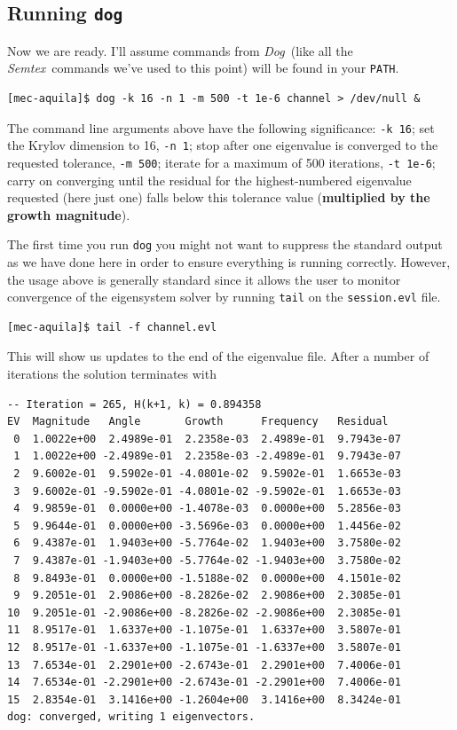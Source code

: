 \documentclass[11pt,a4paper]{report}
\newcommand{\Semtex}{\emph{Semtex}}
\newcommand{\Dog}{\emph{Dog}}
\begin{document}
\subsection{Running \texttt{dog}}

Now we are ready. I'll assume commands from \Dog\ (like all the
\Semtex\ commands we've used to this point) will be found in your
\texttt{PATH}.
{\small
\begin{verbatim}
[mec-aquila]$ dog -k 16 -n 1 -m 500 -t 1e-6 channel > /dev/null &
\end{verbatim}
}The command line arguments above have the following significance:
\verb+-k 16+; set the Krylov dimension to 16, \verb+-n 1+; stop after
one eigenvalue is converged to the requested tolerance,
\verb+-m 500+; iterate for a maximum of 500 iterations, \verb+-t 1e-6+;
carry on converging until the residual for the highest-numbered
eigenvalue requested (here just one) falls below this tolerance value
(\textbf{multiplied by the growth magnitude}).

The first time you run \verb+dog+ you might not want to suppress the
standard output as we have done here in order to ensure everything is
running correctly. However, the usage above is generally standard
since it allows the user to monitor convergence of the eigensystem
solver by running \verb+tail+ on the \verb+session.evl+ file.  {\small
\begin{verbatim}
[mec-aquila]$ tail -f channel.evl
\end{verbatim}
} This will show us updates to the end of the eigenvalue file.  After
a number of iterations the solution terminates with {\small
\begin{verbatim}
-- Iteration = 265, H(k+1, k) = 0.894358
EV  Magnitude   Angle       Growth      Frequency   Residual
 0  1.0022e+00  2.4989e-01  2.2358e-03  2.4989e-01  9.7943e-07
 1  1.0022e+00 -2.4989e-01  2.2358e-03 -2.4989e-01  9.7943e-07
 2  9.6002e-01  9.5902e-01 -4.0801e-02  9.5902e-01  1.6653e-03
 3  9.6002e-01 -9.5902e-01 -4.0801e-02 -9.5902e-01  1.6653e-03
 4  9.9859e-01  0.0000e+00 -1.4078e-03  0.0000e+00  5.2856e-03
 5  9.9644e-01  0.0000e+00 -3.5696e-03  0.0000e+00  1.4456e-02
 6  9.4387e-01  1.9403e+00 -5.7764e-02  1.9403e+00  3.7580e-02
 7  9.4387e-01 -1.9403e+00 -5.7764e-02 -1.9403e+00  3.7580e-02
 8  9.8493e-01  0.0000e+00 -1.5188e-02  0.0000e+00  4.1501e-02
 9  9.2051e-01  2.9086e+00 -8.2826e-02  2.9086e+00  2.3085e-01
10  9.2051e-01 -2.9086e+00 -8.2826e-02 -2.9086e+00  2.3085e-01
11  8.9517e-01  1.6337e+00 -1.1075e-01  1.6337e+00  3.5807e-01
12  8.9517e-01 -1.6337e+00 -1.1075e-01 -1.6337e+00  3.5807e-01
13  7.6534e-01  2.2901e+00 -2.6743e-01  2.2901e+00  7.4006e-01
14  7.6534e-01 -2.2901e+00 -2.6743e-01 -2.2901e+00  7.4006e-01
15  2.8354e-01  3.1416e+00 -1.2604e+00  3.1416e+00  8.3424e-01
dog: converged, writing 1 eigenvectors.
\end{verbatim}
} 
\end{document}
